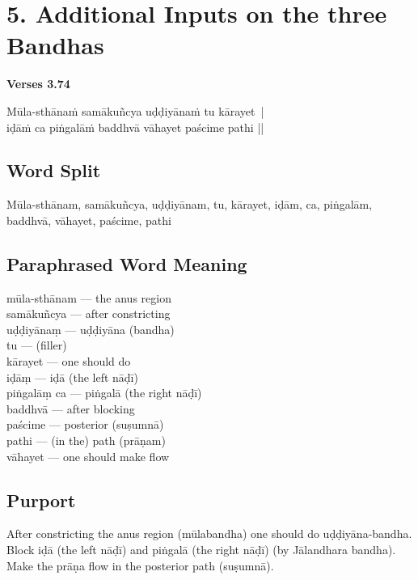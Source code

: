 \section*{5. Additional Inputs on the three Bandhas}

\noindent \textbf{Verses 3.74}

\begin{shloka}
Mūla-sthānaṁ samākuñcya uḍḍiyānaṁ tu kārayet |\\
iḍāṁ ca piṅgalāṁ baddhvā vāhayet paścime pathi ||
\end{shloka}
 
\subsection*{Word Split}

Mūla-sthānam, samākuñcya, uḍḍiyānam, tu, kārayet, iḍām, ca, piṅgalām, baddhvā, vāhayet, paścime, pathi 

\subsection*{Paraphrased Word Meaning}

\begin{multicols}{2}
mūla-sthānam ---  the anus region \\
samākuñcya ---  after constricting \\
uḍḍiyānaṃ ---  uḍḍiyāna (bandha)\\
tu --- (filler) \\
kārayet ---  one should do \\
iḍāṃ ---  iḍā (the left nāḍī)\\
piṅgalāṃ ca --- piṅgalā (the right nāḍī)\\
baddhvā --- after blocking\\
paścime --- posterior (suṣumnā)\\
pathi --- (in the) path (prāṇam)\\
vāhayet --- one should make flow
\end{multicols}

\subsection*{Purport}
\vspace{-5pt}

After constricting the anus region (mūlabandha) one should do uḍḍiyāna-bandha. Block iḍā (the left nāḍī) and piṅgalā (the right nāḍī) (by Jālandhara bandha). Make the  prāṇa flow in the posterior path (suṣumnā). 

